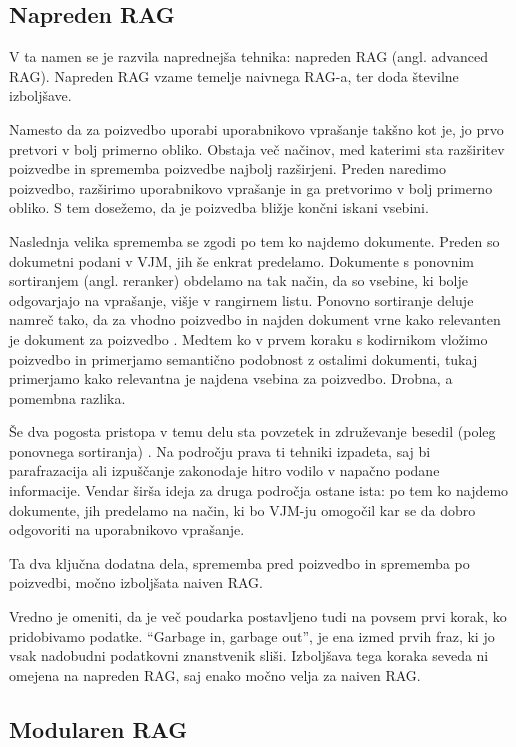 \documentclass[a4paper,12pt,openright]{book}
\begin{document}
\subsection{Napreden RAG}

V ta namen se je razvila naprednejša tehnika: napreden RAG \cite{rag_survey} (angl. advanced RAG). Napreden RAG vzame temelje naivnega RAG-a, ter doda številne izboljšave.

Namesto da za poizvedbo uporabi uporabnikovo vprašanje takšno kot je, jo prvo pretvori v bolj primerno obliko. Obstaja več načinov, med katerimi sta razširitev poizvedbe in sprememba poizvedbe najbolj razširjeni. Preden naredimo poizvedbo, razširimo uporabnikovo vprašanje in ga pretvorimo v bolj primerno obliko. S tem dosežemo, da je poizvedba bližje končni iskani vsebini.

Naslednja velika sprememba se zgodi po tem ko najdemo dokumente. Preden so dokumetni podani v VJM, jih še enkrat predelamo. Dokumente s ponovnim sortiranjem (angl. reranker) obdelamo na tak način, da so vsebine, ki bolje odgovarjajo na vprašanje, višje v rangirnem listu. Ponovno sortiranje deluje namreč tako, da za vhodno poizvedbo in najden dokument vrne kako relevanten je dokument za poizvedbo \cite{query_rewriting}. Medtem ko v prvem koraku s kodirnikom vložimo poizvedbo in primerjamo semantično podobnost z ostalimi dokumenti, tukaj primerjamo kako relevantna je najdena vsebina za poizvedbo. Drobna, a pomembna razlika.

Še dva pogosta pristopa v temu delu sta povzetek in združevanje besedil (poleg ponovnega sortiranja) \cite{other_query_transformations}. Na področju prava ti tehniki izpadeta, saj bi parafrazacija ali izpuščanje zakonodaje hitro vodilo v napačno podane informacije. Vendar širša ideja za druga področja ostane ista: po tem ko najdemo dokumente, jih predelamo na način, ki bo VJM-ju omogočil kar se da dobro odgovoriti na uporabnikovo vprašanje.

Ta dva ključna dodatna dela, sprememba pred poizvedbo in sprememba po poizvedbi, močno izboljšata naiven RAG.

Vredno je omeniti, da je več poudarka postavljeno tudi na povsem prvi korak, ko pridobivamo podatke. “Garbage in, garbage out”, je ena izmed prvih fraz, ki jo vsak nadobudni podatkovni znanstvenik sliši. Izboljšava tega koraka seveda ni omejena na napreden RAG, saj enako močno velja za naiven RAG.

\subsection{Modularen RAG}
\end{document}
